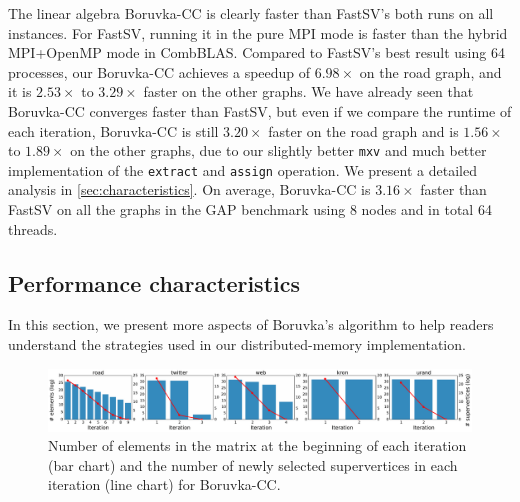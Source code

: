 \documentclass{sokendai_thesis} %
\newcommand{\boruvka}[0]{Boruvka}
\begin{document}
The linear algebra \boruvka{}-CC is clearly faster than FastSV's both runs on all instances.
For FastSV, running it in the pure MPI mode is faster than the hybrid MPI+OpenMP mode in CombBLAS.
Compared to FastSV's best result using 64 processes, our \boruvka{}-CC achieves a speedup of $6.98\times$ on the road graph, and it is $2.53\times$ to $3.29\times$ faster on the other graphs.
We have already seen that \boruvka{}-CC converges faster than FastSV, but even if we compare the runtime of each iteration, \boruvka{}-CC is still $3.20\times$ faster on the road graph and is $1.56\times$ to $1.89\times$ on the other graphs, due to our slightly better \texttt{mxv} and much better implementation of the \texttt{extract} and \texttt{assign} operation.
We present a detailed analysis in \autoref{sec:characteristics}.
On average, \boruvka{}-CC is $3.16\times$ faster than FastSV on all the graphs in the GAP benchmark using 8 nodes and in total 64 threads.

\subsection{Performance characteristics}
\label{sec:characteristics}

In this section, we present more aspects of \boruvka{}'s algorithm to help readers understand the strategies used in our distributed-memory implementation.

\begin{figure}[t]
\centering
\includegraphics[width=\textwidth]{figures/iter-active-CC.pdf}
\caption{Number of elements in the matrix at the beginning of each iteration (bar chart) and the number of newly selected supervertices in each iteration (line chart) for \boruvka{}-CC.}
\vspace{-8pt}
\label{fig:active-cc}
\end{figure}
\end{document}
